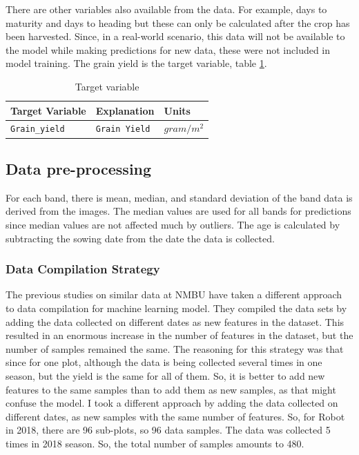 \documentclass[sigconf, nonacm, natbib, screen, balance=False]{acmart}
\begin{document}
There are other variables also available from the data. For example, days to maturity and days to heading but these can only be calculated after the crop has been harvested. Since, in a real-world scenario, this data will not be available to the model while making predictions for new data, these were not included in model training.
The grain yield is the target variable, table \ref{tab:target}.

\begin{table}[h!]
  \caption{Target variable}
  \label{tab:target}
  \begin{tabular}{lll}
    \hline
    Target Variable & Explanation & Units\\\hline
    \verb!Grain_yield! & \verb!Grain Yield! & $gram/{m}^2$ \\

  \end{tabular}
\end{table}


\subsection{Data pre-processing}\label{sec:aspect1}

For each band, there is mean, median, and standard deviation of the band data is derived from the images. The median values are used for all bands for predictions since median values are not affected much by outliers. The age is calculated by subtracting the sowing date from the date the data is collected. 

\subsubsection{Data Compilation Strategy}\label{sec:aspect1}

The previous studies on similar data at NMBU have taken a different approach to data compilation for machine learning model. They compiled the data sets by adding the data collected on different dates as new features in the dataset. This resulted in an enormous increase in the number of features in the dataset, but the number of samples remained the same. The reasoning for this strategy was that since for one plot, although the data is being collected several times in one season, but the yield is the same for all of them. So, it is better to add new features to the same samples than to add them as new samples, as that might confuse the model.
I took a different approach by adding the data collected on different dates, as new samples with the same number of features. So, for Robot in 2018, there are 96 sub-plots, so 96 data samples. The data was collected 5 times in 2018 season. So, the total number of samples amounts to 480. 
\end{document}
